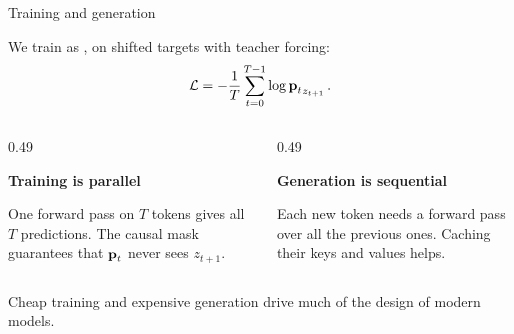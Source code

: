 \begin{frame}{Training and generation}
    \setlength{\parskip}{6pt}

    We train as , on shifted targets with teacher forcing:
    \[
        \mathcal{L}=-\frac{1}{T}\sum_{t=0}^{T-1}\log{\boldsymbol{\mathbf{p}}_t}_{z_{t+1}} \,.
    \]

    \begin{columns}[T,onlytextwidth]
        \begin{column}{0.49\textwidth}
            \begin{tcolorbox}[nndsgreen,courseheight={tf-traingen}{0.2\textheight}]
                \textbf{\color{darkgreen}Training is parallel}

                One forward pass on $T$ tokens gives all $T$ predictions. The
                causal mask guarantees that $\boldsymbol{\mathbf{p}}_t$ never sees $z_{t+1}$.
            \end{tcolorbox}
        \end{column}
        \begin{column}{0.49\textwidth}
            \begin{tcolorbox}[nndsorange,courseheight={tf-traingen}{0.2\textheight}]
                \textbf{\color{draworange!70!black}Generation is sequential}

                Each new token needs a forward pass over all the previous
                ones. Caching their keys and values helps.
            \end{tcolorbox}
        \end{column}
    \end{columns}

    \medskip
    Cheap training and expensive generation drive much of the design of modern
    models.

\end{frame}

